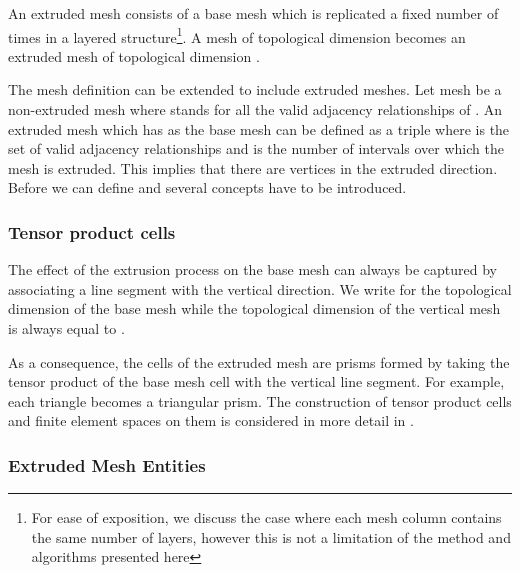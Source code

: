 \documentclass[11pt, a4paper]{scrartcl}
\begin{document}
An extruded mesh consists of a base mesh which is replicated a fixed
number of times in a layered structure\footnote{For ease of
  exposition, we discuss the case where each mesh column contains the
  same number of layers, however this is not a limitation of the
  method and algorithms presented here}. A mesh of topological
dimension  becomes an extruded mesh of topological dimension .

The mesh definition can be extended to include extruded meshes. Let
mesh  be a non-extruded mesh where  stands for
all the valid adjacency relationships of . An extruded mesh which
has  as the base mesh can be defined as a triple
 where
 is the set of valid adjacency relationships and
 is the number of intervals over which the
mesh is extruded.  This implies that there are  vertices in
the extruded direction.  Before we can define  and
 several concepts have to be introduced.

\subsubsection{Tensor product cells}
\label{sssec:tensor-product-cells}
The effect of the extrusion process on the base mesh can always be
captured by associating a line segment with the vertical direction. We
write  for the topological dimension of the base mesh while the
topological dimension of the vertical mesh is always equal to .

As a consequence, the cells of the extruded mesh are prisms formed by
taking the tensor product of the base mesh cell with the vertical line
segment. For example, each triangle becomes a triangular prism.  The
construction of tensor product cells and finite element spaces on them
is considered in more detail in \citet{McRae:2016}.

\subsubsection{Extruded Mesh Entities}
\label{sssec:extruded-mesh-entities}
\end{document}
